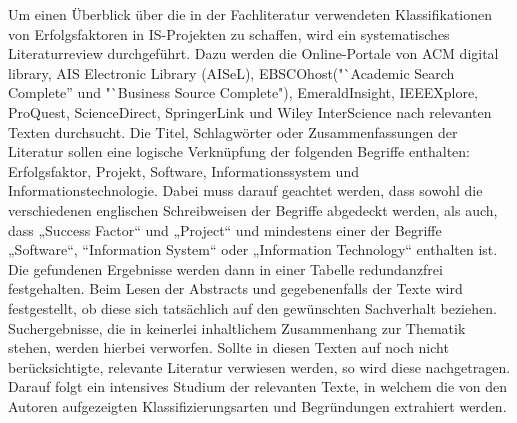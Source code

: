 Um einen Überblick über die in der Fachliteratur verwendeten Klassifikationen von Erfolgsfaktoren in IS-Projekten zu schaffen, wird ein 
systematisches Literaturreview durchgeführt. Dazu werden die Online-Portale von ACM digital library, AIS Electronic Library (AISeL), 
EBSCOhost("`Academic Search Complete” und "`Business Source Complete"), EmeraldInsight, IEEEXplore, ProQuest, ScienceDirect, SpringerLink und 
Wiley InterScience nach relevanten Texten durchsucht. Die Titel, Schlagwörter oder Zusammenfassungen der Literatur
sollen eine logische Verknüpfung der folgenden Begriffe enthalten: Erfolgsfaktor, Projekt, Software, Informationssystem und Informationstechnologie. 
Dabei muss darauf geachtet werden, dass sowohl die verschiedenen englischen Schreibweisen der Begriffe abgedeckt werden, als auch, dass „Success Factor“ und „Project“ und
mindestens einer der Begriffe „Software“, “Information System“ oder „Information Technology“ enthalten ist.\\ 
Die gefundenen Ergebnisse werden dann in einer Tabelle redundanzfrei festgehalten. Beim Lesen der Abstracts und gegebenenfalls der Texte wird festgestellt, ob diese sich tatsächlich auf den 
gewünschten Sachverhalt beziehen. Suchergebnisse, die in keinerlei inhaltlichem Zusammenhang zur Thematik stehen, werden hierbei verworfen.
Sollte in diesen Texten auf noch nicht berücksichtigte, relevante Literatur verwiesen werden, so wird diese nachgetragen.
Darauf folgt ein intensives Studium der relevanten Texte, in welchem die von den Autoren aufgezeigten Klassifizierungsarten und Begründungen extrahiert werden.


